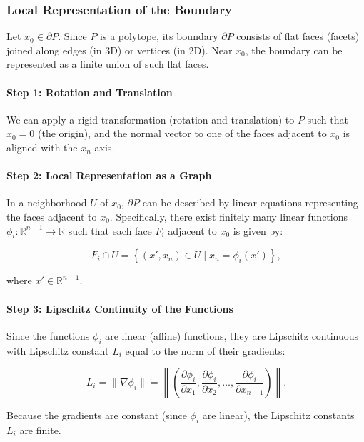 \documentclass{article}
\begin{document}
\subsubsection{Local Representation of the Boundary}

Let \( x_0 \in \partial P \). Since \( P \) is a polytope, its boundary \( \partial P \) consists of flat faces (facets) joined along edges (in 3D) or vertices (in 2D). Near \( x_0 \), the boundary can be represented as a finite union of such flat faces.

\paragraph{Step 1: Rotation and Translation}

We can apply a rigid transformation (rotation and translation) to \( P \) such that \( x_0 = 0 \) (the origin), and the normal vector to one of the faces adjacent to \( x_0 \) is aligned with the \( x_n \)-axis.

\paragraph{Step 2: Local Representation as a Graph}

In a neighborhood \( U \) of \( x_0 \), \( \partial P \) can be described by linear equations representing the faces adjacent to \( x_0 \). Specifically, there exist finitely many linear functions \( \phi_i: \mathbb{R}^{n-1} \rightarrow \mathbb{R} \) such that each face \( F_i \) adjacent to \( x_0 \) is given by:

\[
F_i \cap U = \left\{ (x', x_n) \in U \mid x_n = \phi_i(x') \right\},
\]

where \( x' \in \mathbb{R}^{n-1} \).

\paragraph{Step 3: Lipschitz Continuity of the Functions}

Since the functions \( \phi_i \) are linear (affine) functions, they are Lipschitz continuous with Lipschitz constant \( L_i \) equal to the norm of their gradients:

\[
L_i = \| \nabla \phi_i \| = \left\| \left( \dfrac{\partial \phi_i}{\partial x_1}, \dfrac{\partial \phi_i}{\partial x_2}, \dots, \dfrac{\partial \phi_i}{\partial x_{n-1}} \right) \right\|.
\]

Because the gradients are constant (since \( \phi_i \) are linear), the Lipschitz constants \( L_i \) are finite.
\end{document}
